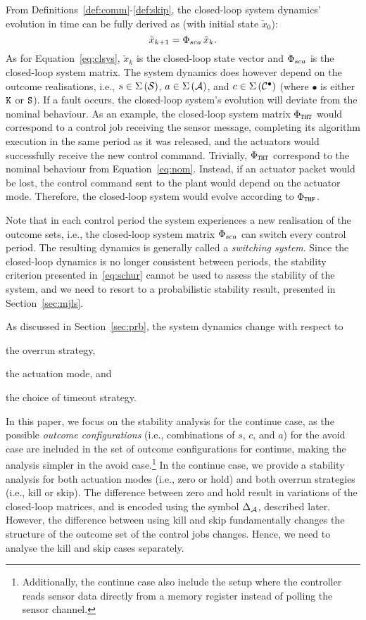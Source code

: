 From Definitions~\ref{def:comm}-\ref{def:skip}, the closed-loop system dynamics' evolution in time can be fully derived as (with initial state $\tilde{x}_0$):
%
\begin{equation}
    \label{eq:cl-dynamics} 
    \tilde x_{k+1} = \clmat_{sca}\, \tilde x_k.
\end{equation}
%
As for Equation~\eqref{eq:clsys}, $\tilde x_k$ is the closed-loop state vector and $\Phi_{sca}$ is the closed-loop system matrix.
The system dynamics does however depend on the outcome realisations, i.e., $s \in \Sigma\left( \mathcal{S} \right)$, $a \in \Sigma\left( \mathcal{A} \right)$, and $c \in \Sigma\,({\mathcal{C}^{\bullet}})$ (where $\bullet$ is either $\texttt{K}$ or $\texttt{S}$).
If a fault occurs, the closed-loop system's evolution will deviate from the nominal behaviour.
As an example, the closed-loop system matrix $\Phi_{\texttt{T}\texttt{H}\texttt{T}}$ would correspond to a control job receiving the sensor message, completing its algorithm execution in the same period as it was released, and the actuators would successfully receive the new control command.
Trivially, $\Phi_{\texttt{T}\texttt{H}\texttt{T}}$ correspond to the nominal behaviour from Equation~\eqref{eq:nom}.
Instead, if an actuator packet would be lost, the control command sent to the plant would depend on the actuator mode.
Therefore, the closed-loop system would evolve according to $\Phi_{\texttt{T}\texttt{H}\texttt{F}}$.

Note that in each control period the system experiences a new realisation of the outcome sets, i.e., the closed-loop system matrix $\Phi_{sca}$ can switch every control period.
The resulting dynamics is generally called a \emph{switching system}.
Since the closed-loop dynamics is no longer consistent between periods, the stability criterion presented in~\eqref{eq:schur} cannot be used to assess the stability of the system, and we need to resort to a probabilistic stability result, presented in Section~\ref{sec:mjls}.

As discussed in Section~\ref{sec:prb}, the system dynamics change with respect to
\begin{enumerate*}[label=(\roman*)]
    \item the overrun strategy,
    \item the actuation mode, and
    \item the choice of timeout strategy.
\end{enumerate*}
In this paper, we focus on the stability analysis for the continue case, as the possible \emph{outcome configurations} (i.e., combinations of $s$, $c$, and $a$) for the avoid case are included in the set of outcome configurations for continue, making the analysis simpler in the avoid case.\footnote{Additionally, the continue case also include the setup where the controller reads sensor data directly from a memory register instead of polling the sensor channel.}
In the continue case, we provide a stability analysis for both actuation modes (i.e., zero or hold) and both overrun strategies (i.e., kill or skip).
The difference between zero and hold result in variations of the closed-loop matrices, and is encoded using the symbol $\Delta_{\mathcal{A}}$, described later.
However, the difference between using kill and skip fundamentally changes the structure of the outcome set of the control jobs changes.
Hence, we need to analyse the kill and skip cases separately.

